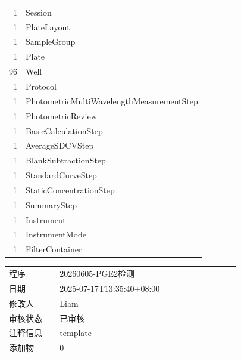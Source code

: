 \documentclass[UTF8,10pt,a4paper,fontset=fandol]{ctexart}
\begin{document}
\begin{tabular}{@{}r l@{}}
1 & Session\\
1 & PlateLayout\\
1 & SampleGroup\\
1 & Plate\\
96 & Well\\
1 & Protocol\\
1 & PhotometricMultiWavelengthMeasurementStep\\
1 & PhotometricReview\\
1 & BasicCalculationStep\\
1 & AverageSDCVStep\\
1 & BlankSubtractionStep\\
1 & StandardCurveStep\\
1 & StaticConcentrationStep\\
1 & SummaryStep\\
1 & Instrument\\
1 & InstrumentMode\\
1 & FilterContainer\\
\end{tabular}

\medskip

\begin{tabular}{@{}p{0.18\linewidth}p{0.64\linewidth}@{}}
程序 & 20260605-PGE2检测\\
日期 & 2025-07-17T13:35:40+08:00\\
修改人 & Liam\\
审核状态 & 已审核\\
注释信息 & template\\
添加物 & 0\\
\end{tabular}

\newpage
\end{document}
